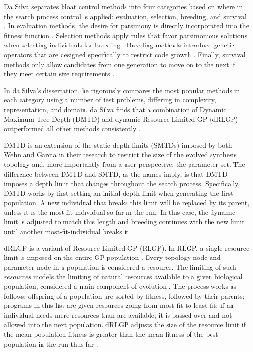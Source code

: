 \documentclass[a4paper,12pt]{report} 	%
\numberwithin{figure}{chapter}
\numberwithin{table}{chapter}
\numberwithin{equation}{chapter}
\begin{document}
\begin{flushleft}
Da Silva separates bloat control methods into four categories based on where in the search process control is applied: evaluation, selection, breeding, and survival \cite[p. 11]{Silva:2008le}. In evaluation methods, the desire for parsimony is directly incorporated into the fitness function \cite[p. 11]{Silva:2008le}. Selection methods apply rules that favor parsimonious solutions when selecting individuals for breeding \cite[p. 12]{Silva:2008le}. Breeding methods introduce genetic operators that are designed specifically to restrict code growth \cite[p. 12]{Silva:2008le}. Finally, survival methods only allow candidates from one generation to move on to the next if they meet certain size requirements \cite[p. 12]{Silva:2008le}. 

In da Silva's dissertation, he rigorously compares the most popular methods in each category using a number of test problems, differing in complexity, representation, and domain. da Silva finds that a combination of Dynamic Maximum Tree Depth (DMTD) and dynamic Resource-Limited GP (dRLGP) outperformed all other methods consistently \cite[p. 86]{Silva:2008le}. 

DMTD is an extension of the static-depth limits (SMTDs) imposed by both Wehn \cite{Wehn:1998bh} and Garcia  \cite{Garcia:2002cq} in their research to restrict the size of the evolved synthesis topology and, more importantly from a user perspective, the parameter set. The difference between DMTD and SMTD, as the names imply, is that DMTD imposes a depth limit that changes throughout the search process. Specifically, DMTD works by first setting an initial depth limit when generating the first population. A new individual that breaks this limit will be replaced by its parent, unless it is the most fit individual so far in the run. In this case, the dynamic limit is adjusted to match this length and breeding continues with the new limit until another most-fit-individual breaks it \cite[p. 17]{Silva:2008le}.

dRLGP is a variant of Resource-Limited GP (RLGP). In RLGP, a single resource limit is imposed on the entire GP population \cite[p. 21]{Silva:2008le}. Every topology node and parameter node in a population is considered a resource. The limiting of such \emph{resources} models the limiting of natural resources available to a given biological population, considered a main component of evolution \cite[p. 21]{Silva:2008le}. The process works as follows: offspring of a population are sorted by fitness, followed by their parents; programs in this list are given resources going from most fit to least fit; if an individual needs more resources than are available, it is passed over and not allowed into the next population. dRLGP adjusts the size of the resource limit if the mean population fitness is greater than the mean fitness of the best population in the run thus far \cite[p. 22]{Silva:2008le}. 


\end{flushleft}
\end{document}
